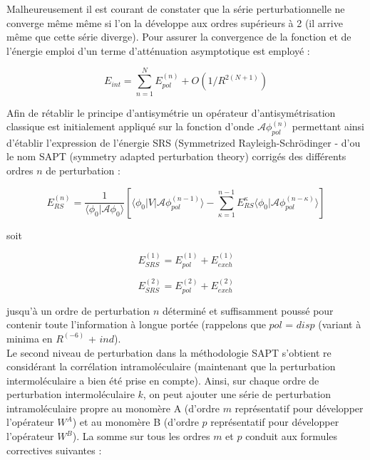    
   Malheureusement il est courant de constater que la série perturbationnelle ne converge même même si l’on la développe aux ordres supérieurs à 2 (il arrive même que cette série diverge).
   Pour assurer la convergence de la fonction et de l’énergie emploi d’un terme d’atténuation asymptotique est employé : 
   
   \begin{equation}
   E_{int} = \sum_{n=1}^{N} E_{pol}^{(n)} + O(1/R^{2 (N+1)})
   \end{equation}
   
   Afin de rétablir le principe d’antisymétrie un opérateur d’antisymétrisation classique est initialement appliqué sur la fonction d’onde $\mathscr{A} \phi_{pol}^{(n)}$ permettant ainsi d’établir l’expression de l’énergie SRS (Symmetrized Rayleigh-Schr\"{o}dinger - d’ou le nom SAPT (symmetry adapted perturbation theory) corrigés des différents ordres $n$ de perturbation :
   	
   	\begin{equation}
   	E_{RS}^{(n)} = \frac{1}{\langle\phi_{0}|\mathscr{A}\phi_{0}\rangle} \left[\langle\phi_{0} | V| \mathscr{A} \phi_{pol}^{(n-1)}\rangle - \sum_{\kappa=1}^{n-1} E_{RS}^{\kappa} \langle \phi_{0}|\mathscr{A} \phi_{pol}^{(n-\kappa)}\rangle\right]
   	\end{equation}
   	
   	soit 
   	
   	\begin{equation}
   	E_{SRS}^{(1)} = E_{pol}^{(1)} + E_{exch}^{(1)}
   	\end{equation}
   	
   	\begin{equation}
   	E_{SRS}^{(2)} = E_{pol}^{(2)} + E_{exch}^{(2)}
   	\end{equation}
   	
   	jusqu’à un ordre de perturbation $n$ déterminé et suffisamment poussé pour contenir toute l’information à longue portée
   	(rappelons que $pol$ = $disp$ (variant à minima en $R^{(-6)}$ + $ind$).\\
   		
   		
   	Le second niveau de perturbation dans la méthodologie SAPT s’obtient re considérant la corrélation intramoléculaire
   		(maintenant que la perturbation intermoléculaire a bien été prise en compte). Ainsi, sur chaque ordre de perturbation intermoléculaire $k$, on peut ajouter une série de perturbation intramoléculaire propre au monomère A (d’ordre $m$ représentatif pour développer l’opérateur $W^{A}$) et au monomère B (d’ordre $p$ représentatif pour développer l’opérateur $W^{B}$). La somme sur tous les ordres $m$ et $p$ conduit aux formules correctives suivantes :
   		
